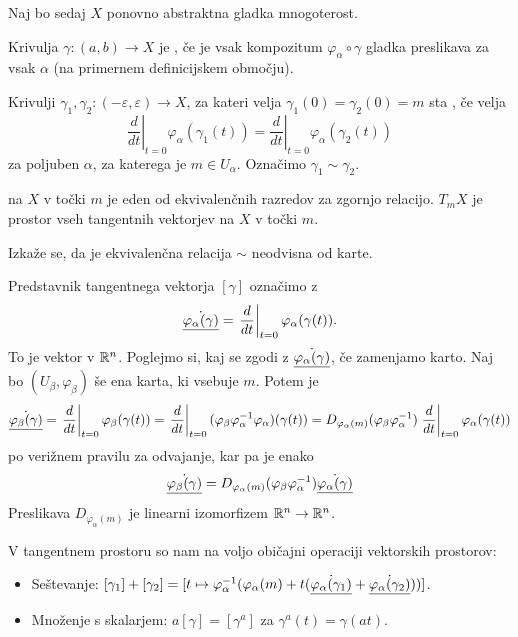 Naj bo sedaj $X$ ponovno abstraktna gladka mnogoterost.

\begin{definicija}
  Krivulja $\gamma: (a,b) \to X$ je , če je vsak kompozitum
  $\varphi_\alpha \circ \gamma$ gladka preslikava za vsak $\alpha$ (na primernem
  definicijskem območju).
\end{definicija}

\begin{definicija}
  Krivulji $\gamma_1, \gamma_2: (-\varepsilon, \varepsilon) \to X$, za kateri
  velja $\gamma_1(0) = \gamma_2(0) = m$ sta , če velja
  \[
	\left. \frac{d}{dt} \right|_{t=0} \varphi_\alpha(\gamma_1(t))
	= \left. \frac{d}{dt} \right|_{t=0} \varphi_\alpha(\gamma_2(t))
  \]
  za poljuben $\alpha$, za katerega je $m \in U_\alpha$.
  Označimo $\gamma_1 \sim \gamma_2$.
\end{definicija}

\begin{definicija}
   na $X$ v točki $m$ je eden od ekvivalenčnih razredov
  za zgornjo relacijo.
   $T_m X$ je prostor vseh tangentnih vektorjev na $X$
  v točki $m$.
\end{definicija}

\begin{opomba}
  Izkaže se, da je ekvivalenčna relacija $\sim$ neodvisna od karte.
\end{opomba}

Predstavnik tangentnega vektorja $[\gamma]$ označimo z
\[
  \dot{\underline{\varphi_\alpha(\gamma)}} = \left. \frac{d}{dt} \right|_{t=0}
  \varphi_\alpha(\gamma(t)).
\]
To je vektor v $\mathbb{R}^n$.
Poglejmo si, kaj se zgodi z $\dot{\underline{\varphi_\alpha(\gamma)}}$, če zamenjamo karto.
Naj bo $(U_\beta, \varphi_\beta)$ še ena karta, ki vsebuje $m$.
Potem je
\[
  \dot{\underline{\varphi_\beta(\gamma)}}
  = \left. \frac{d}{dt} \right|_{t=0} \varphi_\beta(\gamma(t))
  = \left. \frac{d}{dt} \right|_{t=0} (\varphi_\beta \varphi_\alpha^{-1}
  \varphi_\alpha)(\gamma(t))
  = D_{\varphi_\alpha(m)} (\varphi_\beta \varphi_\alpha^{-1}) \left.
	\frac{d}{dt} \right|_{t=0} \varphi_\alpha(\gamma(t))
\]
po verižnem pravilu za odvajanje, kar pa je enako
\[
  \dot{\underline{\varphi_\beta(\gamma)}}
  = D_{\varphi_\alpha(m)} (\varphi_\beta \varphi_\alpha^{-1})
  \dot{\underline{\varphi_\alpha(\gamma)}}
\]
Preslikava $D_{\varphi_\alpha(m)}$ je linearni izomorfizem $\mathbb{R}^n \to \mathbb{R}^n$.

V tangentnem prostoru so nam na voljo običajni operaciji vektorskih prostorov:
\begin{itemize}
\item Seštevanje: $[\gamma_1] + [\gamma_2] = [ t \mapsto
  \varphi_\alpha^{-1}(\varphi_\alpha(m) + t
  (\dot{\underline{\varphi_\alpha(\gamma_1)}} + \dot{\underline{\varphi_\alpha(\gamma_2)}}
  )) ]$.
\item Množenje s skalarjem: $a [\gamma] = [\gamma^a]$ za $\gamma^a(t) =
  \gamma(at)$.
\end{itemize}

